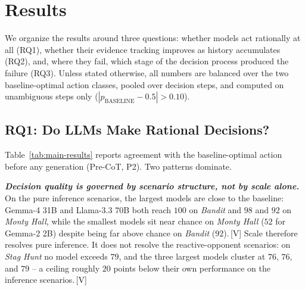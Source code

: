 %
%

\section{Results}

We organize the results around three questions: whether models act rationally
at all (RQ1), whether their evidence tracking improves as history accumulates
(RQ2), and, where they fail, which stage of the decision process produced the
failure (RQ3). Unless stated otherwise, all numbers are balanced over the two
baseline-optimal action classes, pooled over decision steps, and computed on
unambiguous steps only ($|p_{\mathrm{BASELINE}}-0.5|>0.10$).

\subsection{RQ1: Do LLMs Make Rational Decisions?}

Table~\ref{tab:main-results} reports agreement with the baseline-optimal action
before any generation (Pre-CoT, P2). Two patterns dominate.

\textbf{\textit{Decision quality is governed by scenario structure, not by
scale alone.}}
On the pure inference scenarios, the largest models are close to the baseline:
Gemma-4 31B and Llama-3.3 70B both reach $100$ on \textit{Bandit} and $98$ and
$92$ on \textit{Monty Hall}, while the smallest models sit near chance on
\textit{Monty Hall} ($52$ for Gemma-2 2B) despite being far above chance on
\textit{Bandit} ($92$).\,[V] Scale therefore resolves pure inference. It does
not resolve the reactive-opponent scenarios: on \textit{Stag Hunt} no model
exceeds $79$, and the three largest models cluster at $76$, $76$, and $79$ --
a ceiling roughly $20$ points below their own performance on the inference
scenarios.\,[V]

